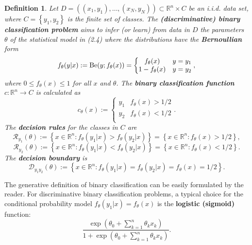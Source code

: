 \documentclass{report}
\newtheorem{definition}{Definition}[chapter]
\begin{document}
\begin{definition}
Let $D = ((x_1,y_1),\dots,(x_N,y_N)) \subset \mathbb{R}^n\times C$ be an i.i.d. data set, where $C = \left\{y_1, y_2 \right\}$ is the finite set of classes. The \textbf{(discriminative) binary classification problem} aims to infer (or learn) from data in $D$ the parameters $\theta$ of the statistical model in (2.4) where the distributions have the \textbf{Bernoullian} form
\begin{equation}
f_\theta(y|x) := \textup{Be}(y;f_\theta(x)) = \left\{\begin{matrix}
f_\theta(x) & y=y_1\\
1 - f_\theta(x) & y = y_2 \\
\end{matrix}\right.,
\end{equation}
where $0 \leq f_\theta(x) \leq 1$ for all $x$ and $\theta$. The \textbf{binary classification function} $c : \mathbb{R}^n \to C$ is calculated as
\begin{equation}
c_\theta(x) := \left\{\begin{matrix}
y_1 & f_\theta(x) > 1/2\\
y_2 & f_\theta(x) < 1/2\\
\end{matrix}\right..
\end{equation}
The \textbf{decision rules} for the classes in $C$ are
\begin{equation}
\mathcal{R}_{y_1}(\theta) :=\left\{ x \in \mathbb{R}^n : f_\theta(y_1|x) > f_\theta(y_2|x) \right\} = \left\{ x \in \mathbb{R}^n : f_\theta(x) > 1/2 \right\},
\end{equation}
\begin{equation}
\mathcal{R}_{y_2}(\theta) := \left\{x \in \mathbb{R}^n : f_\theta(y_1|x) < f_\theta(y_2|x) \right\} = \left\{x \in \mathbb{R}^n : f_\theta(x) < 1/2 \right\}.
\end{equation}
The \textbf{decision boundary} is
\begin{equation}
\mathcal{D}_{y_1y_2}(\theta) :=\left\{x \in \mathbb{R}^n : f_\theta(y_1|x) = f_\theta(y_2|x) = f_\theta(x) = 1/2 \right\}.
\end{equation}
\end{definition}

The generative definition of binary classification can be easily formulated by the reader. For discriminative binary classification problems, a typical choice for the conditional probability model $f_\theta(y_1|x) = f_\theta(x)$ is the \textbf{logistic (sigmoid)} function:
\begin{equation}
\frac{\exp\left ( \theta_0 + \sum_{k=1}^{n}\theta_kx_k \right )}{1+\exp\left ( \theta_0 + \sum_{k=1}^{n}\theta_kx_k \right )}.
\end{equation}
\end{document}
